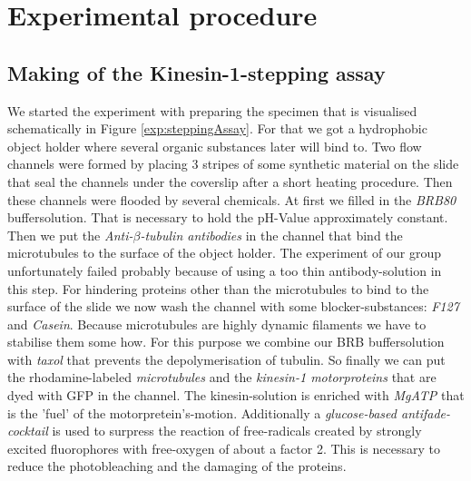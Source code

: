 \section{Experimental procedure}
	\subsection{Making of the Kinesin-1-stepping assay}
	
		
		We started the experiment with preparing the specimen that is visualised schematically in Figure \ref{exp:steppingAssay}. For that we got a hydrophobic object holder where several organic substances later will bind to. Two flow channels were formed by placing 3 stripes of some synthetic material on the slide that seal the channels under the coverslip after a short heating procedure. Then these channels were flooded by several chemicals. At first we filled in the \textit{BRB80} buffersolution. That is necessary to hold the pH-Value approximately constant. Then we put the \textit{Anti-$\beta$-tubulin antibodies} in the channel that bind the microtubules to the surface of the object holder. The experiment of our group unfortunately failed probably because of using a too thin antibody-solution in this step. For hindering proteins other than the microtubules to bind to the surface of the slide we now wash the channel with some blocker-substances: \textit{F127} and \textit{Casein}. Because microtubules are highly dynamic filaments we have to stabilise them some how. For this purpose we combine our BRB buffersolution with \textit{taxol} that prevents the depolymerisation of tubulin. So finally we can put the rhodamine-labeled \textit{microtubules} and the \textit{kinesin-1 motorproteins} that are dyed with GFP in the channel. The kinesin-solution is enriched with \textit{MgATP} that is the 'fuel' of the motorpretein's-motion. Additionally a \textit{glucose-based antifade-cocktail} is used to surpress the reaction of free-radicals created by strongly excited fluorophores with free-oxygen of about a factor 2. This is necessary to reduce the photobleaching and the damaging of the proteins.
